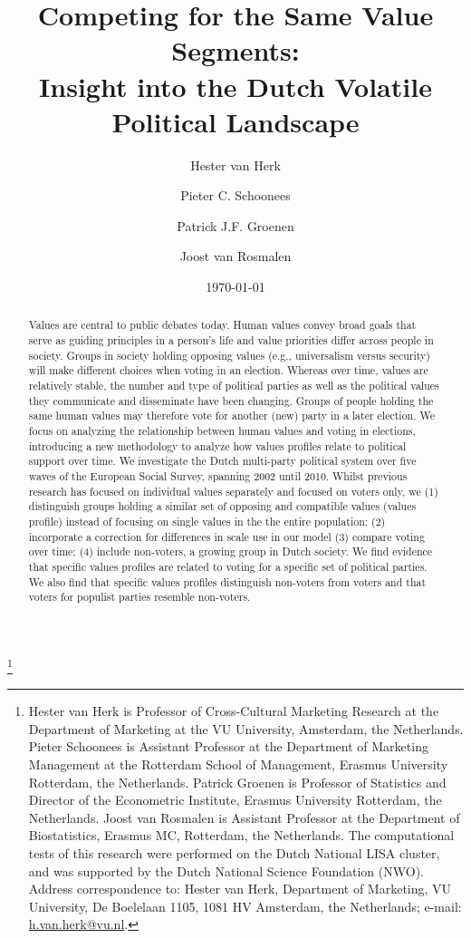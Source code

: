 \documentclass[12pt,letter]{article}\usepackage[]{graphicx}\usepackage[]{xcolor}
\title{Competing for the Same Value Segments:\\ Insight into the Dutch Volatile Political Landscape}
\author{Hester van Herk \and Pieter C. Schoonees \and Patrick J.F. Groenen \and Joost van Rosmalen}
\date{\today}
\begin{document}
\doublespace

\begin{titlepage}
\maketitle
\thispagestyle{empty}
\vfill
\thanks{Hester van Herk is Professor of Cross-Cultural Marketing Research at the Department of Marketing at the VU University, Amsterdam, the Netherlands. Pieter Schoonees is Assistant Professor at the Department of Marketing Management at the Rotterdam School of Management, Erasmus University Rotterdam, the Netherlands. Patrick Groenen is Professor of Statistics and Director of the Econometric Institute, Erasmus University Rotterdam, the Netherlands. Joost van Rosmalen is Assistant Professor at the Department of Biostatistics, Erasmus MC, Rotterdam, the Netherlands. The computational tests of this research were performed on the Dutch National LISA cluster, and was supported by the Dutch National Science Foundation (NWO). Address correspondence to: Hester van Herk, Department of Marketing, VU University, De Boelelaan 1105, 1081 HV Amsterdam, the Netherlands; e-mail: \href{mailto:h.van.herk@vu.nl}{h.van.herk@vu.nl}.}

\vspace*{1em}
\end{titlepage}


\newpage
\begin{abstract}
Values are central to public debates today. Human values convey broad goals that serve as guiding principles in a person's life and value priorities differ across people in society. Groups in society holding opposing values (e.g., universalism versus security) will make different choices when voting in an election. Whereas over time, values are relatively stable, the number and type of political parties as well as the political values they communicate and disseminate have been changing. Groups of people holding the same human values may therefore vote for another (new) party in a later election. We focus on analyzing the relationship between human values and voting in elections, introducing a new methodology to analyze how values profiles relate to political support over time. We investigate the Dutch multi-party political system over five waves of the European Social Survey, spanning 2002 until 2010. Whilst previous research has focused on individual values separately and focused on voters only, we (1) distinguish groups holding a similar set of opposing and compatible values (values profile) instead of focusing on single values in the the entire population; (2) incorporate a correction for differences in scale use in our model (3) compare voting over time; (4) include non-voters, a growing group in Dutch society. We find evidence that specific values profiles are related to voting for a specific set of political parties. We also find that specific values profiles distinguish non-voters from voters and that voters for populist parties resemble non-voters.


\end{abstract}
\end{document}
